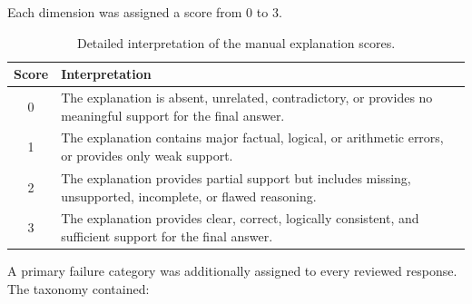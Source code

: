 \documentclass{article}
\begin{document}
Each dimension was assigned a score from 0 to 3.

\begin{table}[h]
\centering
\caption{Detailed interpretation of the manual explanation scores.}
\label{tab:appendix_rubric}
\begin{tabular}{cp{10.5cm}}
\toprule
\textbf{Score} & \textbf{Interpretation} \\
\midrule
0 &
The explanation is absent, unrelated, contradictory, or provides no
meaningful support for the final answer. \\

1 &
The explanation contains major factual, logical, or arithmetic errors,
or provides only weak support. \\

2 &
The explanation provides partial support but includes missing,
unsupported, incomplete, or flawed reasoning. \\

3 &
The explanation provides clear, correct, logically consistent, and
sufficient support for the final answer. \\
\bottomrule
\end{tabular}
\end{table}

A primary failure category was additionally assigned to every reviewed
response. The taxonomy contained:
\end{document}
